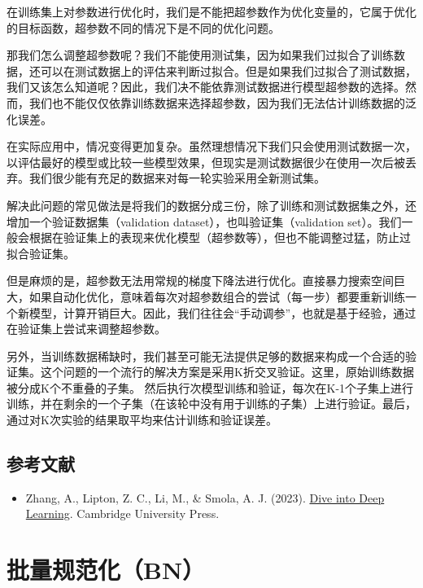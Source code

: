 在训练集上对参数进行优化时，我们是不能把超参数作为优化变量的，它属于优化的目标函数，超参数不同的情况下是不同的优化问题。

那我们怎么调整超参数呢？我们不能使用测试集，因为如果我们过拟合了训练数据，还可以在测试数据上的评估来判断过拟合。但是如果我们过拟合了测试数据，我们又该怎么知道呢？因此，我们决不能依靠测试数据进行模型超参数的选择。然而，我们也不能仅仅依靠训练数据来选择超参数，因为我们无法估计训练数据的泛化误差。

在实际应用中，情况变得更加复杂。虽然理想情况下我们只会使用测试数据一次，以评估最好的模型或比较一些模型效果，但现实是测试数据很少在使用一次后被丢弃。我们很少能有充足的数据来对每一轮实验采用全新测试集。

解决此问题的常见做法是将我们的数据分成三份，除了训练和测试数据集之外，还增加一个验证数据集（validation dataset），也叫验证集（validation set）。我们一般会根据在验证集上的表现来优化模型（超参数等），但也不能调整过猛，防止过拟合验证集。

但是麻烦的是，超参数无法用常规的梯度下降法进行优化。直接暴力搜索空间巨大，如果自动化优化，意味着每次对超参数组合的尝试（每一步）都要重新训练一个新模型，计算开销巨大。因此，我们往往会``手动调参''，也就是基于经验，通过在验证集上尝试来调整超参数。

另外，当训练数据稀缺时，我们甚至可能无法提供足够的数据来构成一个合适的验证集。这个问题的一个流行的解决方案是采用K折交叉验证。这里，原始训练数据被分成K个不重叠的子集。 然后执行次模型训练和验证，每次在K-1个子集上进行训练，并在剩余的一个子集（在该轮中没有用于训练的子集）上进行验证。最后，通过对K次实验的结果取平均来估计训练和验证误差。

\hypertarget{ux53c2ux8003ux6587ux732e-7}{%
\subsection{参考文献}\label{ux53c2ux8003ux6587ux732e-7}}

\vspace{0.25em}
\begin{itemize}
\tightlist
\item
  Zhang, A., Lipton, Z. C., Li, M., \& Smola, A. J. (2023). \href{https://D2L.ai}{Dive into Deep Learning}. Cambridge University Press.
\end{itemize}

\clearpage

\hypertarget{ux6279ux91cfux89c4ux8303ux5316bn}{%
\section{批量规范化（BN）}\label{ux6279ux91cfux89c4ux8303ux5316bn}}

